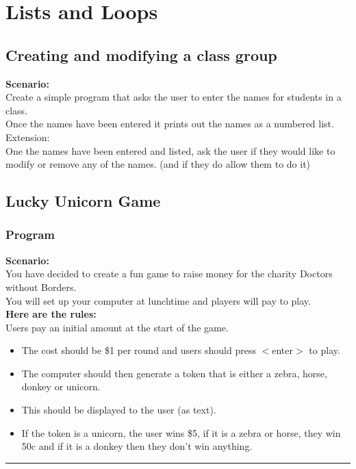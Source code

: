 \documentclass[a4paper,12pt]{article}
\begin{document}
\section{Lists and Loops}
\subsection{Creating and modifying a class group}
\textbf{Scenario:}\\
Create a simple program that asks the user to enter the names for students in a class.\\
Once the names have been entered it prints out the names as a numbered list.\\
Extension:\\
One the names have been entered and listed, ask the user if they would like to modify or remove any of the names.
(and if they do allow them to do it)







\subsection{Lucky Unicorn Game}
\subsubsection{Program}
\textbf{Scenario:}\\
You have decided to create a fun game to raise money for the charity Doctors without Borders.\\ 
You will set up your computer at lunchtime and players will pay to play.  \\

\textbf{Here are the rules:}\\
Users pay an initial amount at the start of the game. 
\begin{itemize}
	\item The cost should be \$1 per round and users should press $<$enter$>$ to play.  
	\item The computer should then generate a token that is either a zebra, horse, donkey or unicorn.  
	\item This should be displayed to the user (as text). 
	\item If the token is a unicorn, the user wins \$5, if it is a zebra or horse, they win 50c and if it is a donkey then they don’t win anything. 
\end{itemize}
\hrule \vspace{0.5cm}
\end{document}
